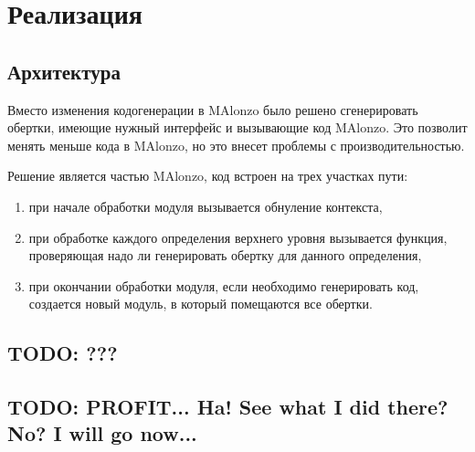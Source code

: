 \section{Реализация}

\subsection{Архитектура}

Вместо изменения кодогенерации в MAlonzo было решено сгенерировать
обертки, имеющие нужный интерфейс и вызывающие код MAlonzo. Это
позволит менять меньше кода в MAlonzo, но это внесет проблемы с производительностью.

Решение является частью MAlonzo, код встроен на трех участках пути:
\begin{enumerate}
\item при начале обработки модуля вызывается обнуление контекста,
\item при обработке каждого определения верхнего уровня вызывается
      функция, проверяющая надо ли генерировать обертку для данного определения,
\item при окончании обработки модуля, если необходимо генерировать код, создается
      новый модуль, в который помещаются все обертки.
\end{enumerate}

\subsection{TODO: ???}

\subsection{TODO: PROFIT... Ha! See what I did there? No? I will go now...}
